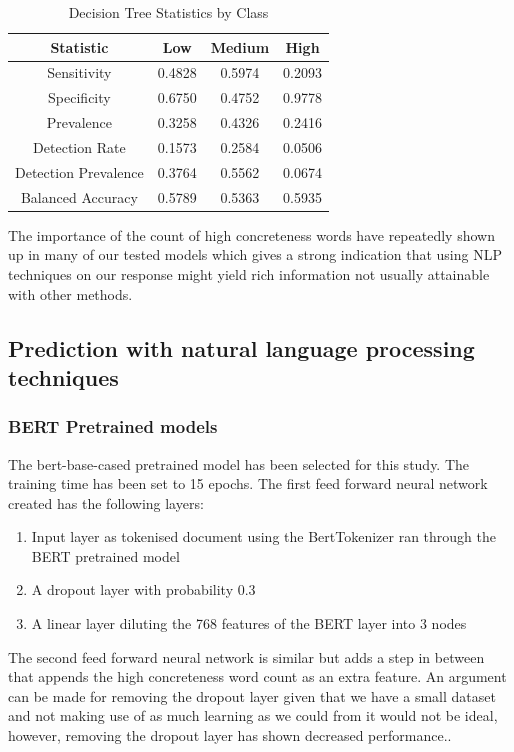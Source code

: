 \documentclass[12pt, a4paper]{article}
\begin{document}
\begin{table}[ht]
\centering
\begin{tabular}{||c c c c||} 
 \hline
 Statistic & Low & Medium & High \\ [0.5ex] 
 \hline\hline
 Sensitivity & 0.4828 & 0.5974 & 0.2093 \\ 
 Specificity & 0.6750 & 0.4752 & 0.9778 \\
 Prevalence & 0.3258 & 0.4326 & 0.2416 \\
 Detection Rate & 0.1573 & 0.2584 & 0.0506 \\
 Detection Prevalence  & 0.3764 & 0.5562 & 0.0674 \\ 
 Balanced Accuracy  & 0.5789 & 0.5363 & 0.5935 \\ [1ex] 
 \hline

\end{tabular}
\caption{Decision Tree Statistics by Class}
\label{table:decisiontreestats}
\end{table}

The importance of the count of high concreteness words have repeatedly shown up in many of our tested models which gives a strong indication that using NLP techniques on our response might yield rich information not usually attainable with other methods.

\subsection{Prediction with natural language processing techniques}

\subsubsection{BERT Pretrained models}
The bert-base-cased pretrained model has been selected for this study. The training time has been set to 15 epochs. The first feed forward neural network created has the following layers: 

\begin{enumerate}
  \item Input layer as tokenised document using the BertTokenizer ran through the BERT pretrained model
  \item A dropout layer with probability 0.3
  \item A linear layer diluting the 768 features of the BERT layer into 3 nodes
\end{enumerate}

The second feed forward neural network is similar but adds a step in between that appends the high concreteness word count as an extra feature. An argument can be made for removing the dropout layer given that we have a small dataset and not making use of as much learning as we could from it would not be ideal, however, removing the dropout layer has shown decreased performance.. 
\end{document}
